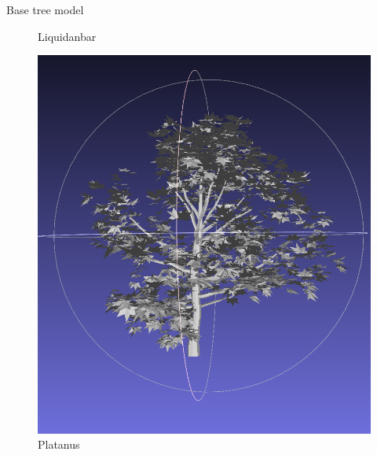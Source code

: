 \documentclass[12pt]{beamer}
\begin{document}
\begin{frame}{Base tree model}
\begin{figure}[H]
\begin{minipage}{0.24\textwidth}
        \caption{Liquidanbar}
    \end{minipage}\hfill
    \begin{minipage}{0.24\textwidth}
        \centering
        \includegraphics[width=\textwidth]{images/platanus.png}
        \caption{Platanus}
    \end{minipage}\hfill
    \begin{minipage}{0.24\textwidth}
        \centering

\end{minipage}
\end{figure}
\end{frame}
\end{document}
